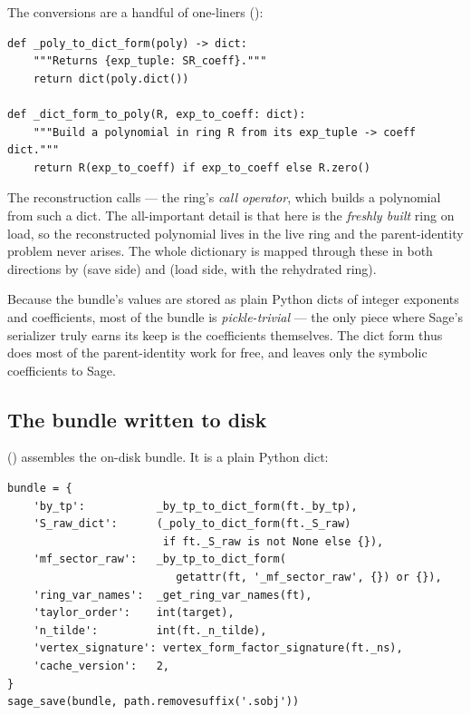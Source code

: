 The conversions are a handful of one-liners
():

\begin{lstlisting}
def _poly_to_dict_form(poly) -> dict:
    """Returns {exp_tuple: SR_coeff}."""
    return dict(poly.dict())

def _dict_form_to_poly(R, exp_to_coeff: dict):
    """Build a polynomial in ring R from its exp_tuple -> coeff dict."""
    return R(exp_to_coeff) if exp_to_coeff else R.zero()
\end{lstlisting}

The reconstruction calls  --- the ring's \emph{call
operator}, which builds a polynomial from such a dict. The all-important detail
is that  here is the \emph{freshly built} ring on load, so the
reconstructed polynomial lives in the live ring and the parent-identity problem
never arises. The whole  dictionary is mapped through these in
both directions by  (save side) and
 (load side, with the rehydrated
ring).

\begin{note}
Because the bundle's values are stored as plain Python dicts of integer
exponents and  coefficients, most of the bundle is \emph{pickle-trivial}
--- the only piece where Sage's serializer truly earns its keep is the 
coefficients themselves. The dict form thus does most of the
parent-identity work for free, and leaves only the symbolic coefficients to
Sage.
\end{note}

\subsection{The bundle written to disk}

 () assembles the
on-disk bundle. It is a plain Python dict:

\begin{lstlisting}
bundle = {
    'by_tp':           _by_tp_to_dict_form(ft._by_tp),
    'S_raw_dict':      (_poly_to_dict_form(ft._S_raw)
                        if ft._S_raw is not None else {}),
    'mf_sector_raw':   _by_tp_to_dict_form(
                          getattr(ft, '_mf_sector_raw', {}) or {}),
    'ring_var_names':  _get_ring_var_names(ft),
    'taylor_order':    int(target),
    'n_tilde':         int(ft._n_tilde),
    'vertex_signature': vertex_form_factor_signature(ft._ns),
    'cache_version':   2,
}
sage_save(bundle, path.removesuffix('.sobj'))
\end{lstlisting}

